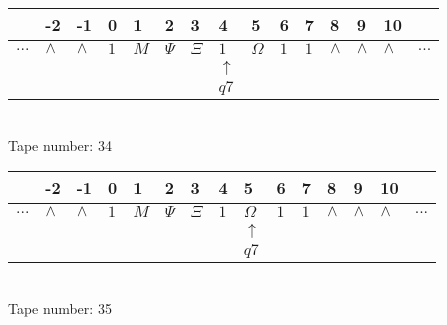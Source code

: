 \documentclass{article}
\begin{document}
\begin{table}[H]
\centering
\begin{tabular}{lllllllllllllll}
 & -2 & -1 & 0 & 1 & 2 & 3 & 4 & 5 & 6 & 7 & 8 & 9 & 10 & \\
\hline
$...$ & \multicolumn{1}{|l|}{$\wedge$} & \multicolumn{1}{|l|}{$\wedge$} & \multicolumn{1}{|l|}{$1$} & \multicolumn{1}{|l|}{$M$} & \multicolumn{1}{|l|}{$\Psi$} & \multicolumn{1}{|l|}{$\Xi$} & \multicolumn{1}{|l|}{$1$} & \multicolumn{1}{|l|}{$\Omega$} & \multicolumn{1}{|l|}{$1$} & \multicolumn{1}{|l|}{$1$} & \multicolumn{1}{|l|}{$\wedge$} & \multicolumn{1}{|l|}{$\wedge$} & \multicolumn{1}{|l|}{$\wedge$} & $...$\\
\hline
&  &  &  &  &  &  & $\uparrow$ &  &  &  &  &  &  &  \\
&  &  &  &  &  &  & $ q7 $ &  &  &  &  &  &  &  \\
\end{tabular}
\\
Tape number: 34
\noindent\makebox[\linewidth]{\hdashrule{\textwidth}{1pt}{1pt}}\end{table}
\clearpage

\begin{table}[H]
\centering
\begin{tabular}{lllllllllllllll}
 & -2 & -1 & 0 & 1 & 2 & 3 & 4 & 5 & 6 & 7 & 8 & 9 & 10 & \\
\hline
$...$ & \multicolumn{1}{|l|}{$\wedge$} & \multicolumn{1}{|l|}{$\wedge$} & \multicolumn{1}{|l|}{$1$} & \multicolumn{1}{|l|}{$M$} & \multicolumn{1}{|l|}{$\Psi$} & \multicolumn{1}{|l|}{$\Xi$} & \multicolumn{1}{|l|}{$1$} & \multicolumn{1}{|l|}{$\Omega$} & \multicolumn{1}{|l|}{$1$} & \multicolumn{1}{|l|}{$1$} & \multicolumn{1}{|l|}{$\wedge$} & \multicolumn{1}{|l|}{$\wedge$} & \multicolumn{1}{|l|}{$\wedge$} & $...$\\
\hline
&  &  &  &  &  &  &  & $\uparrow$ &  &  &  &  &  &  \\
&  &  &  &  &  &  &  & $ q7 $ &  &  &  &  &  &  \\
\end{tabular}
\\
Tape number: 35
\noindent\makebox[\linewidth]{\hdashrule{\textwidth}{1pt}{1pt}}\end{table}
\end{document}
